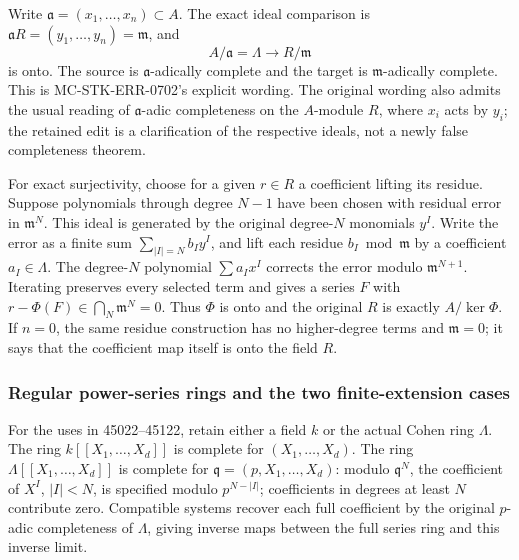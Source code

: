 Write \(\mathfrak a=(x_1,\ldots,x_n)\subset A\). The exact ideal comparison is \(\mathfrak aR=(y_1,\ldots,y_n)=\mathfrak m\), and \[
 A/\mathfrak a=\Lambda\longrightarrow R/\mathfrak m
\] is onto. The source is \(\mathfrak a\)-adically complete and the target is \(\mathfrak m\)-adically complete. This is MC-STK-ERR-0702's explicit wording. The original wording also admits the usual reading of \(\mathfrak a\)-adic completeness on the \(A\)-module \(R\), where \(x_i\) acts by \(y_i\); the retained edit is a clarification of the respective ideals, not a newly false completeness theorem.

For exact surjectivity, choose for a given \(r\in R\) a coefficient lifting its residue. Suppose polynomials through degree \(N-1\) have been chosen with residual error in \(\mathfrak m^N\). This ideal is generated by the original degree-\(N\) monomials \(y^I\). Write the error as a finite sum \(\sum_{|I|=N}b_Iy^I\), and lift each residue \(b_I\bmod\mathfrak m\) by a coefficient \(a_I\in\Lambda\). The degree-\(N\) polynomial \(\sum a_Ix^I\) corrects the error modulo \(\mathfrak m^{N+1}\). Iterating preserves every selected term and gives a series \(F\) with \(r-\Phi(F)\in\bigcap_N\mathfrak m^N=0\). Thus \(\Phi\) is onto and the original \(R\) is exactly \(A/\ker\Phi\). If \(n=0\), the same residue construction has no higher-degree terms and \(\mathfrak m=0\); it says that the coefficient map itself is onto the field \(R\).

\subsubsection{Regular power-series rings and the two finite-extension cases}\label{regular-power-series-rings-and-the-two-finite-extension-cases}

For the uses in 45022--45122, retain either a field \(k\) or the actual Cohen ring \(\Lambda\). The ring \(k[[X_1,\ldots,X_d]]\) is complete for \((X_1,\ldots,X_d)\). The ring \(\Lambda[[X_1,\ldots,X_d]]\) is complete for \(\mathfrak q=(p,X_1,\ldots,X_d)\): modulo \(\mathfrak q^N\), the coefficient of \(X^I\), \(|I|<N\), is specified modulo \(p^{N-|I|}\); coefficients in degrees at least \(N\) contribute zero. Compatible systems recover each full coefficient by the original \(p\)-adic completeness of \(\Lambda\), giving inverse maps between the full series ring and this inverse limit.

